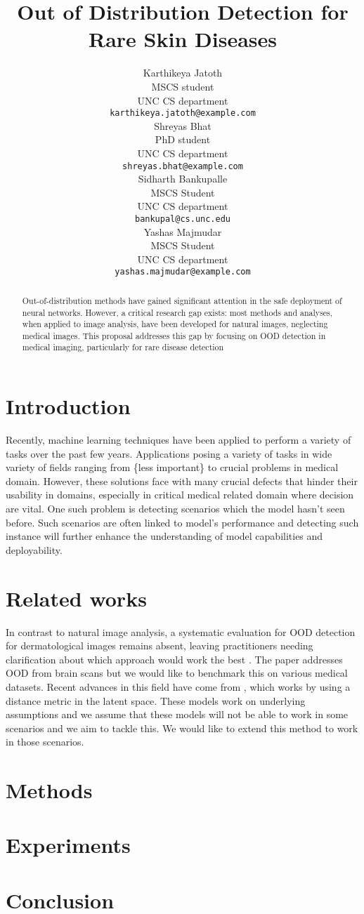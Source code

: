 \documentclass{article}
\title{Out of Distribution Detection for Rare Skin Diseases}
\author{
  Karthikeya Jatoth \\
  MSCS student \\
  UNC CS department \\
  \texttt{karthikeya.jatoth@example.com} \\
  \And
  Shreyas Bhat \\
  PhD student \\
  UNC CS department \\
  \texttt{shreyas.bhat@example.com} \\
  \And
  Sidharth Bankupalle \\
  MSCS Student \\
  UNC CS department \\
  \texttt{bankupal@cs.unc.edu} \\
  \And
  Yashas Majmudar \\
  MSCS Student \\
  UNC CS department \\
  \texttt{yashas.majmudar@example.com}
}
\begin{document}
\maketitle


\begin{abstract}
   Out-of-distribution methods have gained significant attention in the safe deployment of neural networks. However, a critical research gap exists: most methods and analyses, when applied to image analysis, have been developed for natural images, neglecting medical images. This proposal addresses this gap by focusing on OOD detection in medical imaging, particularly for rare disease detection
\end{abstract}


\section{Introduction}
Recently, machine learning techniques have been applied to perform a variety of tasks over the past few years. Applications posing a variety of tasks in wide variety of fields ranging from \{less important\} to crucial problems in medical domain. However, these solutions face with many crucial defects that hinder their usability in domains, especially in critical medical related domain where decision are vital. One such problem is detecting scenarios which the model hasn't seen before. Such scenarios are often linked to model's performance and detecting such instance will further enhance the understanding of model capabilities and deployability.
\section{Related works}
In contrast to natural image analysis, a systematic evaluation for OOD detection for dermatological images remains absent, leaving practitioners needing clarification about which approach would work the best  \cite{Cao2022}. The paper \cite{Mahmood2021} addresses OOD from brain scans but we would like to benchmark this on various medical datasets. Recent advances in this field have come from  \cite{Du2022}, \cite{Sun2022} which works by using a distance metric in the latent space. These models work on underlying assumptions and we assume that these models will not be able to work in some scenarios and we aim to tackle this. We would like to extend this method to work in those scenarios.
\section{Methods}
\section{Experiments}
\section{Conclusion}


\end{document}
